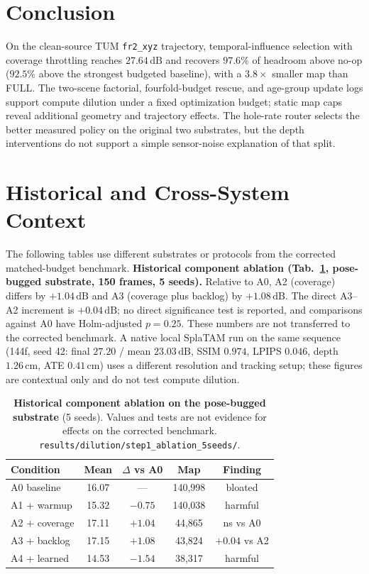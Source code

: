 \documentclass[10pt,twocolumn,letterpaper]{article}
\begin{document}
\section{Conclusion}
On the clean-source TUM \texttt{fr2\_xyz} trajectory, temporal-influence selection with coverage throttling reaches $27.64\,\mathrm{dB}$ and recovers $97.6\%$ of headroom above no-op ($92.5\%$ above the strongest budgeted baseline), with a $3.8\times$ smaller map than FULL. The two-scene factorial, fourfold-budget rescue, and age-group update logs support compute dilution under a fixed optimization budget; static map caps reveal additional geometry and trajectory effects. The hole-rate router selects the better measured policy on the original two substrates, but the depth interventions do not support a simple sensor-noise explanation of that split.

\appendix
\section{Historical and Cross-System Context}
The following tables use different substrates or protocols from the corrected matched-budget benchmark.
\textbf{Historical component ablation (Tab.~\ref{tab:ablation}, pose-bugged substrate, 150 frames, 5 seeds).} Relative to A0, A2 (coverage) differs by $+1.04\,\mathrm{dB}$ and A3 (coverage plus backlog) by $+1.08\,\mathrm{dB}$. The direct A3--A2 increment is $+0.04\,\mathrm{dB}$; no direct significance test is reported, and comparisons against A0 have Holm-adjusted $p=0.25$. These numbers are not transferred to the corrected benchmark.
A native local SplaTAM run on the same sequence (144f, seed 42: final $27.20$ / mean $23.03\,\mathrm{dB}$, SSIM $0.974$, LPIPS $0.046$, depth $1.26\,\mathrm{cm}$, ATE $0.41\,\mathrm{cm}$) uses a different resolution and tracking setup; these figures are contextual only and do not test compute dilution.

\begin{table}[tbp]
\centering
\footnotesize\setlength{\tabcolsep}{3pt}
\begin{tabular}{lcccc}
\toprule
\textbf{Condition} & \textbf{Mean} & \textbf{$\Delta$ vs A0} & \textbf{Map} & \textbf{Finding} \\
\midrule
A0 baseline & 16.07 & --- & 140,998 & bloated \\
A1 + warmup & 15.32 & $-0.75$ & 140,038 & harmful \\
A2 + coverage & 17.11 & $+1.04$ & 44,865 & ns vs A0 \\
A3 + backlog & 17.15 & $+1.08$ & 43,824 & $+0.04$ vs A2 \\
A4 + learned & 14.53 & $-1.54$ & 38,317 & harmful \\
\bottomrule
\end{tabular}
\caption{\textbf{Historical component ablation on the pose-bugged substrate} (5 seeds). Values and tests are not evidence for effects on the corrected benchmark. \texttt{results/dilution/step1\_ablation\_5seeds/}.}
\label{tab:ablation}
\end{table}
\end{document}

